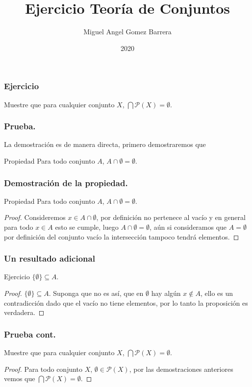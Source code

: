 \documentclass{beamer}
\title{Ejercicio Teoría de Conjuntos}
\author{Miguel Angel Gomez Barrera}
\institute{Fundación Universitaria Konrad Lorenz}
\date{2020}
\begin{document}
	\frame{\titlepage}
	\begin{frame}
		\frametitle{Ejercicio}
		Muestre que para cualquier conjunto $X$, $\bigcap \mathcal{P}(X) = \emptyset$.	
	\end{frame}
	\begin{frame}
		\frametitle{Prueba.}
		\begin{block}{}
			La demostración es de manera directa, primero demostraremos que
			\begin{block}{Propiedad}
				Para todo conjunto $A$, $A \cap \emptyset = \emptyset.$
			\end{block} 
		\end{block}
	\end{frame}
	\begin{frame}
		\frametitle{Demostración de la propiedad.}
		\begin{block}{Propiedad}
			Para todo conjunto $A$, $A \cap \emptyset = \emptyset.$
			\begin{proof}
				Consideremos $x \in A \cap \emptyset$, por definición no pertenece al vacío y en general para todo $x \in A$ esto se cumple, luego $A \cap \emptyset = \emptyset$, aún si consideramos que $A = \emptyset$ por definición del conjunto vacío la intersección tampoco tendrá elementos.
			\end{proof}
		\end{block} 
	\end{frame}
	\begin{frame}
		\frametitle{Un resultado adicional}
		\begin{block}{Ejercicio}
			$\{\emptyset\} \subseteq A$.
			\begin{proof}
				$\{\emptyset\} \subseteq A$. Suponga que no es así, que en $\emptyset$ hay algún $x \notin A$, ello es un contradicción dado que el vacío no tiene elementos, por lo tanto la proposición es verdadera.
			\end{proof}
		\end{block}
	\end{frame}
	\begin{frame}
		\frametitle{Prueba cont.}
		\begin{block}{}
			Muestre que para cualquier conjunto $X$, $\bigcap \mathcal{P}(X) = \emptyset$.	
			\begin{proof}
				Para todo conjunto $X$, $\emptyset \in \mathcal{P}(X)$, por las demostraciones anteriores vemos que $\bigcap \mathcal{P}(X) = \emptyset.$
			\end{proof}
		\end{block}
	\end{frame}
\end{document}
